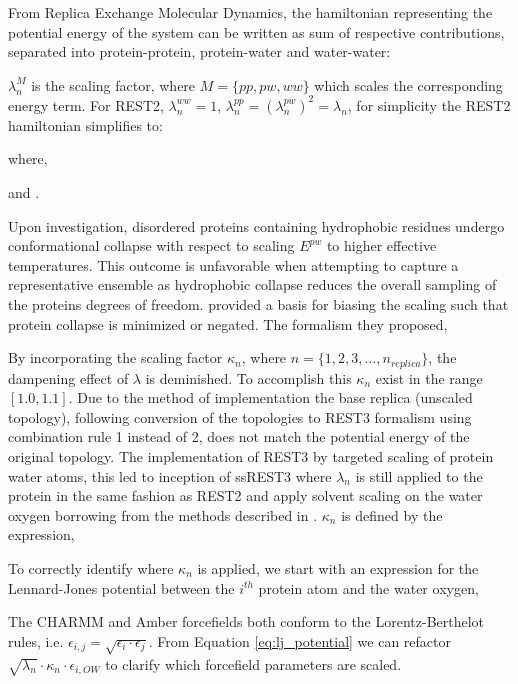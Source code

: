 From Replica Exchange Molecular Dynamics\cite{Sugita1999}, the hamiltonian representing the potential energy of the system can be written as sum of respective contributions, separated into protein-protein, protein-water and water-water:

$\lambda_{n}^M$ is the scaling factor, where $M=\{ pp, pw, ww\}
$ which scales the corresponding energy term. For REST2\cite{Wang2011}, $\lambda_n^{ww}=1$, $\lambda_n^{pp}=(\lambda_n^{pw})^2=\lambda_n$, for simplicity the REST2 hamiltonian simplifies to:

where,

and . 

Upon investigation, disordered proteins containing hydrophobic residues undergo conformational collapse with respect to scaling  $E^{pw}$ to higher effective temperatures. This outcome is unfavorable when attempting to capture a representative ensemble as hydrophobic collapse reduces the overall sampling of the proteins degrees of freedom. %
\citeauthor{Zhang2023} \citeyear{Zhang2023} provided a basis for biasing the scaling such that protein collapse is minimized or negated. The formalism they proposed,

By incorporating the scaling factor $\kappa_n$, where $n=\{1,2,3,\ldots,n_{replica}\}$, the dampening effect of $\lambda$ is deminished. To accomplish this $\kappa_n$ exist in the range $[1.0,1.1]$. Due to the method of implementation the base replica (unscaled topology), following conversion of the topologies to REST3 \cite{Zhang2023} formalism using combination rule 1 instead of 2, does not match the potential energy of the original topology. The implementation of REST3 by \citeauthor{Zhang2023} targeted scaling of protein water atoms, this led to inception of ssREST3 where $\lambda_n$ is still applied to the protein in the same fashion as REST2 \cite{Wang2011} and apply solvent scaling on the water oxygen borrowing from the methods described in \citeauthor{Best2010} \citeyear{Best2010}. $\kappa_n$ is defined by the expression, 

To correctly identify where $\kappa_n$ is applied, we start with an expression for the Lennard-Jones potential between the $i^{th}$ protein atom and the water oxygen,

The CHARMM and Amber forcefields both conform to the Lorentz-Berthelot rules, i.e. $\epsilon_{i,j}=\sqrt{\epsilon_i\cdot \epsilon_j}$. From Equation \ref{eq:lj_potential} we can refactor $\sqrt{\lambda_n}\cdot\kappa_n\cdot\epsilon_{i,OW}$ to clarify which forcefield parameters are scaled. 


%



